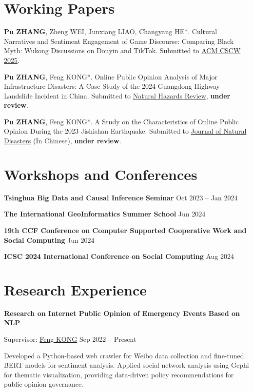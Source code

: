 \documentclass[letterpaper, 11pt]{article}
\newcommand{\sepspace}{\vspace{0.5em}}
\begin{document}
\begingroup
\setlength{\parskip}{0pt}
\nocite{*}
\printbibliography[heading=none]
\endgroup

\section{Working Papers}

\textbf{Pu ZHANG}, Zheng WEI, Junxiang LIAO, Changyang HE*. Cultural Narratives and Sentiment Engagement of Game Discourse: Comparing Black Myth: Wukong Discussions on Douyin and TikTok. Submitted to \href{https://cscw.acm.org/2025/}{ACM CSCW 2025}.

\sepspace
\textbf{Pu ZHANG}, Feng KONG*. Online Public Opinion Analysis of Major Infrastructure Disasters: A Case Study of the 2024 Guangdong Highway Landslide Incident in China. Submitted to \href{https://ascelibrary.org/journal/nhrefo}{Natural Hazards Review}, \textbf{under review}.

\sepspace
\textbf{Pu ZHANG}, Feng KONG*. A Study on the Characteristics of Online Public Opinion During the 2023 Jishishan Earthquake. Submitted to {\href{https://zrzh.paperonce.org/#/}{Journal of Natural Disasters}} (In Chinese), \textbf{under review}.

\section{Workshops and Conferences}
\textbf{Tsinghua Big Data and Causal Inference Seminar} \hfill Oct 2023 -- Jan 2024

\sepspace
\textbf{The International GeoInformatics Summer School} \hfill Jun 2024

\sepspace
\textbf{19th CCF Conference on Computer Supported Cooperative Work and Social Computing} \hfill Jun 2024

\sepspace
\textbf{ICSC 2024 International Conference on Social Computing} \hfill Aug 2024

\section{Research Experience}
\textbf{Research on Internet Public Opinion of Emergency Events Based on NLP}

Supervisor: \href{https://cohd.cau.edu.cn/art/2020/11/27/art_48059_998984.html}{Feng KONG} \hfill Sep 2022 -- Present

Developed a Python-based web crawler for Weibo data collection and fine-tuned BERT models for sentiment analysis. Applied social network analysis using Gephi for thematic visualization, providing data-driven policy recommendations for public opinion governance.
\end{document}
